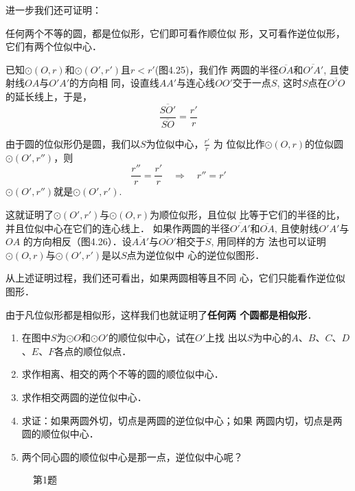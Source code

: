进一步我们还可证明：

\begin{blk}{}
任何两个不等的圆，都是位似形，它们即可看作顺位似
形，又可看作逆位似形，它们有两个位似中心．
\end{blk}

已知$\odot (O,r)$和$\odot (O',r')$且$r<r'$(图4.25)，我们作
两圆的半径$\overline{OA}$和$\overline{O'A'}$, 且使射线$OA$与$O'A'$的方向相
同，设直线$AA'$与连心线$OO'$交于一点$S$, 这时$S$点在$\overline{O'O}$
的延长线上，于是，
\[\frac{\overline{SO'}}{\overline{SO}}=\frac{r'}{r}\]

由于圆的位似形仍是圆，我们以$S$为位似中心，$\frac{r'}{r}$
为
位似比作$\odot (O,r)$的位似圆$\odot (O',r'')$，则
\[\frac{r''}{r}=\frac{r'}{r}\quad \Rightarrow\quad r''=r'\]
$\odot (O',r'')$就是$\odot (O',r')$.

这就证明了$\odot (O',r')$与$\odot (O,r)$为顺位似形，且位似
比等于它们的半径的比，并且位似中心在它们的连心线上．
如果作两圆的半径$\overline{O'A'}$和$\overline{OA}$, 且使射线$O'A'$与$OA$
的方向相反（图4.26）．设$\overline{AA'}$与$\overline{OO'}$相交于$S$, 用同样的方
法也可以证明$\odot (O,r)$与$\odot (O',r')$是以$S$点为逆位似中
心的逆位似图形．

从上述证明过程，我们还可看出，如果两圆相等且不同
心，它们只能看作逆位似图形．

由于凡位似形都是相似形，这样我们也就证明了\textbf{任何两
个圆都是相似形}．

\begin{ex}
\begin{enumerate}
    \item 在图中$S$为$\odot O$和$\odot O'$的顺位似中心，试在$O'$上找
    出以$S$为中心的$A$、$B$、$C$、$D$、$E$、$F$各点的顺位似点．
    \item 求作相离、相交的两个不等的圆的顺位似中心．
    \item 求作相交两圆的逆位似中心．
    \item 求证：如果两圆外切，切点是两圆的逆位似中心；如果
    两圆内切，切点是两圆的顺位似中心．
    \item 两个同心圆的顺位似中心是那一点，逆位似中心呢？
\end{enumerate}
\end{ex}

\begin{figure}[htp]
    \centering
{}
    \caption*{第1题}
\end{figure}

